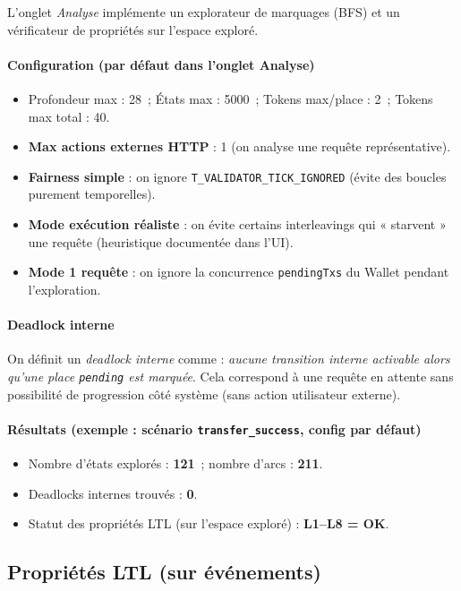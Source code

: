 \documentclass[11pt,a4paper]{article}
\begin{document}
L'onglet \emph{Analyse} implémente un explorateur de marquages (BFS) et un vérificateur de propriétés sur l'espace exploré.

\paragraph{Configuration (par défaut dans l'onglet Analyse)}
\begin{itemize}[leftmargin=*]
  \item Profondeur max : 28\ ; États max : 5000\ ; Tokens max/place : 2\ ; Tokens max total : 40.
  \item \textbf{Max actions externes HTTP} : 1 (on analyse une requête représentative).
  \item \textbf{Fairness simple} : on ignore \texttt{T\_VALIDATOR\_TICK\_IGNORED} (évite des boucles purement temporelles).
  \item \textbf{Mode exécution réaliste} : on évite certains interleavings qui « starvent » une requête (heuristique documentée dans l'UI).
  \item \textbf{Mode 1 requête} : on ignore la concurrence \texttt{pendingTxs} du Wallet pendant l'exploration.
\end{itemize}

\paragraph{Deadlock interne}
On définit un \emph{deadlock interne} comme : \emph{aucune transition interne activable alors qu'une place \texttt{pending} est marquée}. Cela correspond à une requête en attente sans possibilité de progression côté système (sans action utilisateur externe).

\paragraph{Résultats (exemple : scénario \texttt{transfer\_success}, config par défaut)}
\begin{itemize}[leftmargin=*]
  \item Nombre d'états explorés : \textbf{121}\ ; nombre d'arcs : \textbf{211}.\newline
  \item Deadlocks internes trouvés : \textbf{0}.
  \item Statut des propriétés LTL (sur l'espace exploré) : \textbf{L1--L8 = OK}.
\end{itemize}

\subsection{Propriétés LTL (sur événements)}
\end{document}
